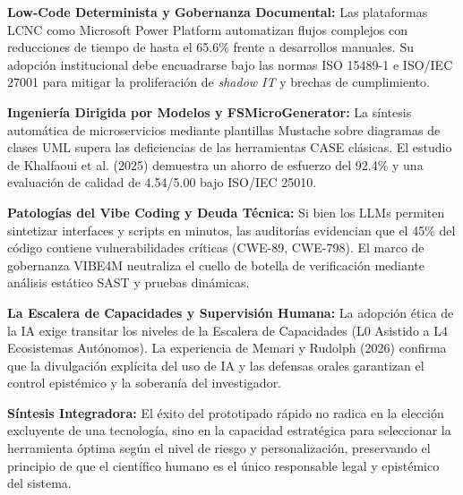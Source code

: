 \begin{resumenlist}[topsep=0.08cm, itemsep=0.08cm, parsep=0pt]
    \item \textbf{Low-Code Determinista y Gobernanza Documental:} Las plataformas LCNC como Microsoft Power Platform automatizan flujos complejos con reducciones de tiempo de hasta el 65.6\% frente a desarrollos manuales. Su adopción institucional debe encuadrarse bajo las normas ISO 15489-1 e ISO/IEC 27001 para mitigar la proliferación de \textit{shadow IT} y brechas de cumplimiento.
    \item \textbf{Ingeniería Dirigida por Modelos y FSMicroGenerator:} La síntesis automática de microservicios mediante plantillas Mustache sobre diagramas de clases UML supera las deficiencias de las herramientas CASE clásicas. El estudio de Khalfaoui et al. (2025) demuestra un ahorro de esfuerzo del 92.4\% y una evaluación de calidad de 4.54/5.00 bajo ISO/IEC 25010.
    \item \textbf{Patologías del Vibe Coding y Deuda Técnica:} Si bien los LLMs permiten sintetizar interfaces y scripts en minutos, las auditorías evidencian que el 45\% del código contiene vulnerabilidades críticas (CWE-89, CWE-798). El marco de gobernanza VIBE4M neutraliza el cuello de botella de verificación mediante análisis estático SAST y pruebas dinámicas.
    \item \textbf{La Escalera de Capacidades y Supervisión Humana:} La adopción ética de la IA exige transitar los niveles de la Escalera de Capacidades (L0 Asistido a L4 Ecosistemas Autónomos). La experiencia de Memari y Rudolph (2026) confirma que la divulgación explícita del uso de IA y las defensas orales garantizan el control epistémico y la soberanía del investigador.
\end{resumenlist}

\vspace{0.15cm}
\begin{cajabeige}
\textbf{Síntesis Integradora:} El éxito del prototipado rápido no radica en la elección excluyente de una tecnología, sino en la capacidad estratégica para seleccionar la herramienta óptima según el nivel de riesgo y personalización, preservando el principio de que el científico humano es el único responsable legal y epistémico del sistema.
\end{cajabeige}


\newpage
{}
